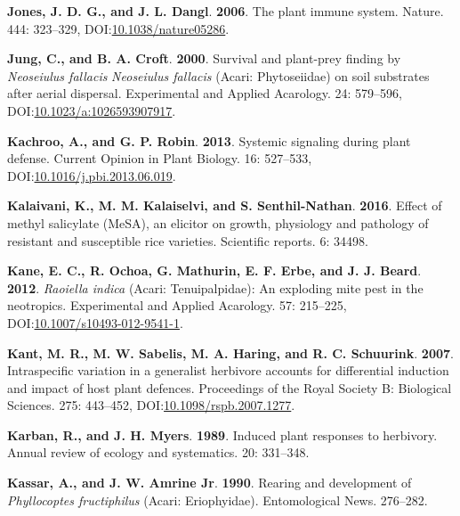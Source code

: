 \documentclass[12pt,final,CPage]{ufthesis}
\newlength{\cslhangindent}
\newenvironment{CSLReferences}[2] %
{%
	\setlength{\parindent}{0pt}
	\ifodd #1 \everypar{\setlength{\hangindent}{\cslhangindent}}\ignorespaces\fi
	\ifnum #2 > 0
	\setlength{\parskip}{#2\baselineskip}
	\fi
}%
{}
\begin{document}
{\begin{CSLReferences}{1}{0}
  \leavevmode{}%
  \textbf{Jones, J. D. G., and J. L. Dangl}. \textbf{2006}. The plant immune system. Nature. 444: 323--329, DOI:\href{https://doi.org/10.1038/nature05286}{10.1038/nature05286}.

  \leavevmode{}%
  \textbf{Jung, C., and B. A. Croft}. \textbf{2000}. Survival and plant-prey finding by {\emph{Neoseiulus fallacis}} {\emph{Neoseiulus fallacis}} ({Acari}: {Phytoseiidae}) on soil substrates after aerial dispersal. Experimental and Applied Acarology. 24: 579--596, DOI:\href{https://doi.org/10.1023/a:1026593907917}{10.1023/a:1026593907917}.

  \leavevmode{}%
  \textbf{Kachroo, A., and G. P. Robin}. \textbf{2013}. Systemic signaling during plant defense. Current Opinion in Plant Biology. 16: 527--533, DOI:\href{https://doi.org/10.1016/j.pbi.2013.06.019}{10.1016/j.pbi.2013.06.019}.

  \leavevmode{}%
  \textbf{Kalaivani, K., M. M. Kalaiselvi, and S. Senthil-Nathan}. \textbf{2016}. Effect of methyl salicylate {(MeSA)}, an elicitor on growth, physiology and pathology of resistant and susceptible rice varieties. Scientific reports. 6: 34498.

  \leavevmode{}%
  \textbf{Kane, E. C., R. Ochoa, G. Mathurin, E. F. Erbe, and J. J. Beard}. \textbf{2012}. {\emph{Raoiella indica}} ({Acari}: {Tenuipalpidae}): An exploding mite pest in the neotropics. Experimental and Applied Acarology. 57: 215--225, DOI:\href{https://doi.org/10.1007/s10493-012-9541-1}{10.1007/s10493-012-9541-1}.

  \leavevmode{}%
  \textbf{Kant, M. R., M. W. Sabelis, M. A. Haring, and R. C. Schuurink}. \textbf{2007}. Intraspecific variation in a generalist herbivore accounts for differential induction and impact of host plant defences. Proceedings of the Royal Society B: Biological Sciences. 275: 443--452, DOI:\href{https://doi.org/10.1098/rspb.2007.1277}{10.1098/rspb.2007.1277}.

  \leavevmode{}%
  \textbf{Karban, R., and J. H. Myers}. \textbf{1989}. Induced plant responses to herbivory. Annual review of ecology and systematics. 20: 331--348.

  \leavevmode{}%
  \textbf{Kassar, A., and J. W. Amrine Jr}. \textbf{1990}. Rearing and development of {\emph{Phyllocoptes fructiphilus}} ({Acari}: {Eriophyidae}). Entomological News. 276--282.


\end{CSLReferences}}
\end{document}
